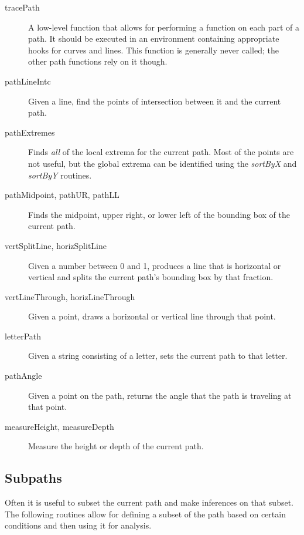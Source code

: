 \documentclass[12pt]{article}
\begin{document}
\begin{description}
\item[tracePath] A low-level function that allows for performing a function on
each part of a path. It should be executed in an environment containing
appropriate hooks for curves and lines. This function is generally never called;
the other path functions rely on it though.

\item[pathLineIntc] Given a line, find the points of intersection between it and
the current path.

\item[pathExtremes] Finds \emph{all} of the local extrema for the current path.
Most of the points are not useful, but the global extrema can be identified
using the \emph{sortByX} and \emph{sortByY} routines.

\item[pathMidpoint, pathUR, pathLL] Finds the midpoint, upper right, or lower
left of the bounding box of the current path.

\item[vertSplitLine, horizSplitLine] Given a number between 0 and 1, produces a
line that is horizontal or vertical and splits the current path's bounding box
by that fraction.

\item[vertLineThrough, horizLineThrough] Given a point, draws a horizontal or
vertical line through that point.

\item[letterPath] Given a string consisting of a letter, sets the current path
to that letter.

\item[pathAngle] Given a point on the path, returns the angle that the path is
traveling at that point.

\item[measureHeight, measureDepth] Measure the height or depth of the current
path.

\end{description}

\subsection{Subpaths}

Often it is useful to subset the current path and make inferences on that
subset. The following routines allow for defining a subset of the path based on
certain conditions and then using it for analysis.
\end{document}
